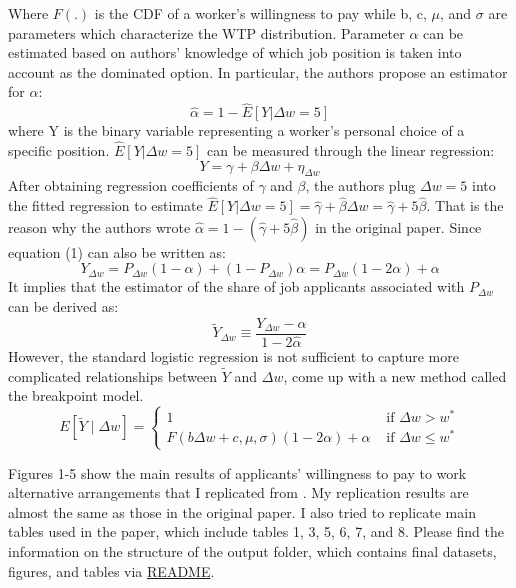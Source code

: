 \documentclass[11pt]{article}
\begin{document}
Where $F(.)$ is the CDF of a worker's willingness to pay while b, c, $\mu$, and $\sigma$ are parameters which characterize the WTP distribution. Parameter $\alpha$ can be estimated based on authors' knowledge of which job position is taken into account as the dominated option. In particular, the authors propose an estimator for $\alpha$:
\begin{equation}
\hat{\alpha} = 1 - \hat{E}[Y|\Delta w = 5]
\end{equation}
where Y is the binary variable representing a worker's personal choice of a specific position. $\hat{E}[Y|\Delta w = 5]$ can be measured through the linear regression:
\begin{equation}
Y = \gamma + \beta \Delta w + \eta_{\Delta w}
\end{equation}
After obtaining regression coefficients of $\gamma$ and $\beta$, the authors plug $\Delta w = 5$ into the fitted regression to estimate $\hat{E}[Y|\Delta w = 5] = \hat{\gamma} + \hat{\beta} \Delta w = \hat{\gamma} + 5 \hat{\beta}$. That is the reason why the authors wrote $\hat{\alpha} = 1 - (\hat{\gamma} + 5 \hat{\beta})$ in the original paper. Since equation (1) can also be written as:
\begin{equation}
Y_{\Delta w} = P_{\Delta w}(1-\alpha)+(1-P_{\Delta w}) \alpha = P_{\Delta w}(1-2\alpha)+\alpha
\end{equation}
It implies that the estimator of the share of job applicants associated with $P_{\Delta w}$ can be derived as:
\begin{equation}
\tilde{Y}_{\Delta w} \equiv \frac{Y_{\Delta w}-\hat{\alpha}}{1-2 \hat{\alpha}}
\end{equation}
However, the standard logistic regression is not sufficient to capture more complicated relationships between $\tilde{Y}$ and $\Delta w$, \cite{10.1257/aer.20161500} come up with a new method called the breakpoint model.
\begin{equation}
E[\tilde{Y} \mid \Delta w]= \begin{cases}1 & \text { if } \Delta w>w^* \\ F\left(b \Delta w+c, \mu, \sigma\right)(1-2 \alpha)+\alpha & \text { if } \Delta w \leq w^*\end{cases}
\end{equation}

Figures 1-5 show the main results of applicants' willingness to pay to work alternative arrangements that I replicated from \cite{10.1257/aer.20161500}. My replication results are almost the same as those in the original paper. I also tried to replicate main tables used in the paper, which include tables 1, 3, 5, 6, 7, and 8. Please find the information on the structure of the output folder, which contains final datasets, figures, and tables via \href{https://github.com/mtrihoang/valuing_alternative_work_arrangements/blob/main/README.md}{README}. \\
\end{document}
